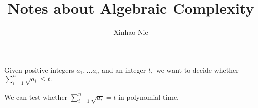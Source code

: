 \documentclass[12pt]{article}
\begin{document}
\title{Notes about Algebraic Complexity}
\author{Xinhao Nie}
\maketitle

\section{\SqrtSum}

\begin{Define}
  Given positive integers $a_1, \dots a_n$ and an integer $t,$ we want to decide whether $\sum_{i=1}^n\sqrt{a_i} \leq t.$
\end{Define}


\begin{Lemma}
  We can test whether $\sum_{i=1}^n \sqrt{a_i} = t$ in polynomial
  time.
\end{Lemma}
\end{document}
